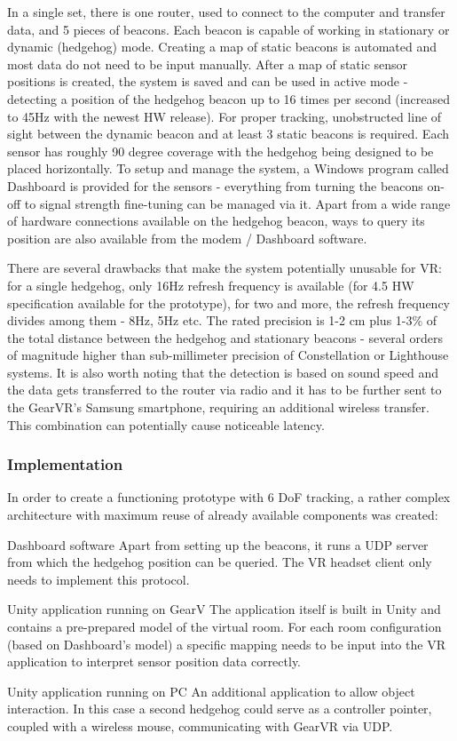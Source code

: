 \documentclass[12pt, a4paper]{article}
\newenvironment{definitions}
{\begin{description}[style=nextline]}
{\end{description}}
\begin{document}
In a single set, there is one router, used to connect to the computer and transfer data, and 5 pieces of beacons. Each beacon is capable of working in stationary or dynamic (hedgehog) mode. Creating a map of static beacons is automated and most data do not need to be input manually. After a map of static sensor positions is created, the system is saved and can be used in active mode - detecting a position of the hedgehog beacon up to 16 times per second (increased to 45Hz with the newest HW release). For proper tracking, unobstructed line of sight between the dynamic beacon and at least 3 static beacons is required. Each sensor has roughly 90 degree coverage with the hedgehog being designed to be placed horizontally. To setup and manage the system, a Windows program called Dashboard is provided for the sensors - everything from turning the beacons on-off to signal strength fine-tuning can be managed via it. Apart from a wide range of hardware connections available on the hedgehog beacon, ways to query its position are also available from the modem / Dashboard software.

There are several drawbacks that make the system potentially unusable for VR: for a single hedgehog, only 16Hz refresh frequency is available (for 4.5 HW specification available for the prototype), for two and more, the refresh frequency divides among them - 8Hz, 5Hz etc. The rated precision is 1-2 cm plus 1-3\% of the total distance between the hedgehog and stationary beacons - several orders of magnitude higher than sub-millimeter precision of Constellation or Lighthouse systems. It is also worth noting that the detection is based on sound speed and the data gets transferred to the router via radio and it has to be further sent to the GearVR’s Samsung smartphone, requiring an additional wireless transfer. This combination can potentially cause noticeable latency.

\subsubsection{Implementation}
In order to create a functioning prototype with 6 DoF tracking, a rather complex architecture with maximum reuse of already available components was created:

\begin{definitions}
\item[Dashboard software] Apart from setting up the beacons, it runs a UDP server from which the hedgehog position can be queried. The VR headset client only needs to implement this protocol.
\item[Unity application running on GearV] The application itself is built in Unity and contains a pre-prepared model of the virtual room. For each room configuration (based on Dashboard’s model) a specific mapping needs to be input into the VR application to interpret sensor position data correctly.
\item[Unity application running on PC] An additional application to allow object interaction. In this case a second hedgehog could serve as a controller pointer, coupled with a wireless mouse, communicating with GearVR via UDP.
\end{definitions}
\end{document}

